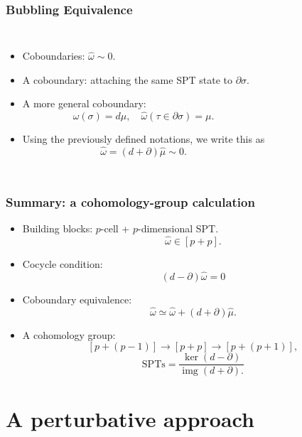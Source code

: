 \documentclass[xcolor=table, 10pt, aspectratio=43]{beamer}
\DeclareMathOperator{\img}{img}
\begin{document}
\begin{frame}
	\frametitle{Bubbling Equivalence}
\begin{columns}
\begin{itemize}
\item Coboundaries: $\hat\omega\sim0$.
\item A coboundary: attaching the same SPT state to  $\partial \sigma$.
\item A more general coboundary:
\[\hat\omega(\sigma)=d\mu,\quad
\hat\omega(\tau\in\partial\sigma) = \mu.\]
\item Using the previously defined notations, we write this as
\[\hat\omega = (d+\partial)\hat\mu\sim0.\]
\end{itemize}
\begin{animateinline}{5}
\end{animateinline}
\end{columns}
\end{frame}

\begin{frame}
\frametitle{Summary: a cohomology-group calculation}
\begin{itemize}
\item Building blocks: $p$-cell + $p$-dimensional SPT.
\[\hat\omega\in[p+p].\]
\item Cocycle condition:
\[(d-\partial)\hat\omega=0\]
\item Coboundary equivalence:
\[\hat\omega\simeq\hat\omega+(d+\partial)\hat\mu.\]
\item A cohomology group:
\[[p+(p-1)]\rightarrow[p+p]\rightarrow[p+(p+1)],\]
\[\text{SPTs}=\frac{\ker(d-\partial)}{\img(d+\partial).}\]
\end{itemize}
\end{frame}

\section{A perturbative approach}
\end{document}
